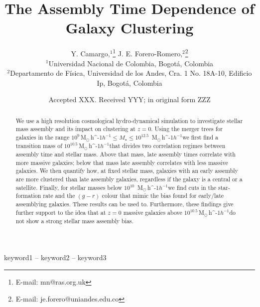 \documentclass[a4paper,fleqn,usenatbib]{mnras}
\title[Galaxy Assembly Bias]{The Assembly Time Dependence of Galaxy Clustering}
\author[Camargo, Y.BUSCAR ADS \& Forero-Romero]{
Y. Camargo,$^{1}$\thanks{E-mail: mn@ras.org.uk}
J. E. Forero-Romero,$^{2}$\thanks{E-mail: je.forero@uniandes.edu.co}
\\
$^{1}$Universidad Nacional de Colombia, Bogot\'a, Colombia\\
$^{2}$Departamento de F\'isica, Universidad de los Andes, Cra. 1 No.
18A-10, Edificio Ip, Bogot\'a, Colombia\\
}
\date{Accepted XXX. Received YYY; in original form ZZZ}
\newcommand{\Msunh}{\,{\rm M}$_{\odot}$\,\ifmmode h^{-1}\else $h^{-1}$\fi}
\begin{document}
\label{firstpage}
\pagerange{\pageref{firstpage}--\pageref{lastpage}}
\maketitle

\begin{abstract}
    We use a high resolution cosmological hydro-dynamical simulation
    to investigate stellar mass assembly 
    and its impact on clustering at $z=0$.
    Using the merger trees for galaxies in the range $10^{9}$\Msunh $\leq M_{\star} \leq 10^{12.5}$ \Msunh we first find a transition mass of $10^{10.5}$\Msunh that divides two
    correlation regimes between assembly time and stellar mass.
    Above that mass, late assembly times correlate with more massive
    galaxies; below that mass late assembly correlates with less massive
galaxies.
We then quantify how, at fixed stellar mass, galaxies with an early
assembly
are more clustered than late assembly galaxies, regardless if the galaxy
is a central or a satellite.
Finally, for stellar masses below $10^{10}$ \Msunh we find 
cuts in the star-formation rate and the $(g-r)$ colour that mimic
the bias found for early/late assemblying galaxies.
These results can be used to.
Furthermore, these findings give further support to the idea that at
$z=0$  massive galaxies above $10^{10.5}$\Msunh do not show a strong
stellar mass assembly bias.
\end{abstract}

\begin{keywords}
keyword1 -- keyword2 -- keyword3
\end{keywords}


\end{document}
